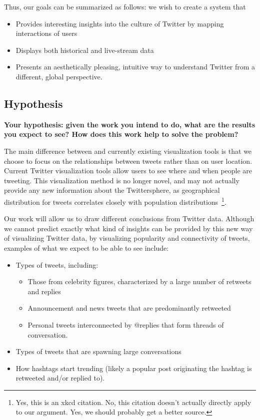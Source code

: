 Thus, our goals can be summarized as follows: we wish to create a system that
\begin{itemize}[noitemsep]
\item Provides interesting insights into the culture of Twitter by mapping interactions of users
\item Displays both historical and live-stream data
\item Presents an aesthetically pleasing, intuitive way to understand Twitter from a different, global perspective.
\end{itemize}

\subsection{Hypothesis} \label{sec:hypothesis}
\textbf{Your hypothesis: given the work you intend to do, what are the results you expect to see? How does this work help to solve the problem?}

The main difference between \sys and currently existing visualization tools is that we choose
to focus on the relationships between tweets rather than on user location. Current Twitter visualization tools
allow users to see where and when people are tweeting. This visualization method is no longer novel, and may not actually provide
any new information about the Twittersphere, as geographical distribution for tweets correlates closely with population
distributions~\cite{xkcd-heatmap}\footnote{Yes, this is an xkcd citation. No, this citation doesn't actually directly apply
to our argument. Yes, we should probably get a better source.}.

Our work will allow us to draw different conclusions from Twitter
data. Although we cannot predict exactly what kind of insights can be provided by this new way of visualizing Twitter data,
by visualizing popularity and connectivity of tweets, examples of what we expect to be able to see include:
\begin{itemize}[noitemsep]
\item Types of tweets, including:
\begin{itemize}[noitemsep, nolistsep]
\item Those from celebrity figures, characterized by a large number of retweets and replies
\item Announcement and news tweets that are predominantly retweeted
\item Personal tweets interconnected by @replies that form threads of conversation.
\end{itemize}
\item Types of tweets that are spawning large conversations
\item How hashtags start trending (likely a popular post originating the hashtag is retweeted and/or replied to).
\end{itemize}

